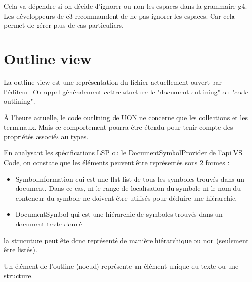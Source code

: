 \documentclass[
    iict, %
    il, %
]{heig-tb}
\begin{document}
Cela va dépendre si on décide d'ignorer ou non les espaces dans la grammaire g4.
Les développeurs de c3 recommandent de ne pas ignorer les espaces. Car cela permet de gérer plus de cas particuliers.

\section{Outline view}

La outline view est une représentation du fichier actuellement ouvert par l'éditeur.
On appel généralement cettre stucture le "document outlining" ou "code outlining".

À l'heure actuelle, le code outlining de UON ne concerne que les collections et les terminaux.
Mais ce comportement pourra être étendu pour tenir compte des propriétés associés au types.

En analysant les spécifications LSP ou le DocumentSymbolProvider de l'api VS Code, on constate que les
éléments peuvent être représentés sous 2 formes :

\begin{itemize}
    \item SymbolInformation qui est une flat list de tous les symboles trouvés dans un document. Dans ce cas, ni le range de localisation du symbole ni le nom du conteneur du symbole ne doivent être utilisés pour déduire une hiérarchie.
    \item DocumentSymbol qui est une hiérarchie de symboles trouvés dans un document texte donné
\end{itemize}

la strucuture peut ête donc représenté de manière hiérarchique ou non (seulement être listés).




Un élément de l'outline (noeud) représente un élément unique du texte ou une structure.
\end{document}

